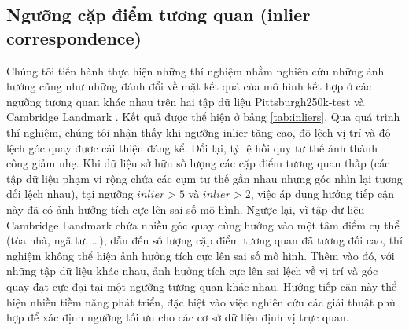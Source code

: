\subsection{Ngưỡng cặp điểm tương quan (inlier correspondence)}

Chúng tôi tiến hành thực hiện những thí nghiệm nhằm nghiên cứu những ảnh hưởng cũng như những đánh đổi về mặt kết quả của mô hình kết hợp ở các ngưỡng tương quan khác nhau trên hai tập dữ liệu Pittsburgh250k-test \cite{6618963} và Cambridge Landmark \cite{kendall2016posenet}. Kết quả được thể hiện ở bảng \ref{tab:inliers}. Qua quá trình thí nghiệm, chúng tôi nhận thấy khi ngưỡng inlier tăng cao, độ lệch vị trí và độ lệch góc quay được cải thiện đáng kể. Đổi lại, tỷ lệ hồi quy tư thế ảnh thành công giảm nhẹ. Khi dữ liệu sở hữu số lượng các cặp điểm tương quan thấp (các tập dữ liệu phạm vi rộng chứa các cụm tư thế gần nhau nhưng góc nhìn lại tương đối lệch nhau), tại ngưỡng $inlier > 5$ và $inlier > 2$, việc áp dụng hướng tiếp cận này đã có ảnh hưởng tích cực lên sai số mô hình. Ngược lại, vì tập dữ liệu Cambridge Landmark chứa nhiều góc quay cùng hướng vào một tâm điểm cụ thể (tòa nhà, ngã tư, \dots), dẫn đến số lượng cặp điểm tương quan đã tương đối cao, thí nghiệm không thể hiện ảnh hưởng tích cực lên sai số mô hình. Thêm vào đó, với những tập dữ liệu khác nhau, ảnh hưởng tích cực lên sai lệch về vị trí và góc quay đạt cực đại tại một ngưỡng tương quan khác nhau. Hướng tiếp cận này thể hiện nhiều tiềm năng phát triển, đặc biệt vào việc nghiên cứu các giải thuật phù hợp để xác định ngưỡng tối ưu cho các cơ sở dữ liệu định vị trực quan.

